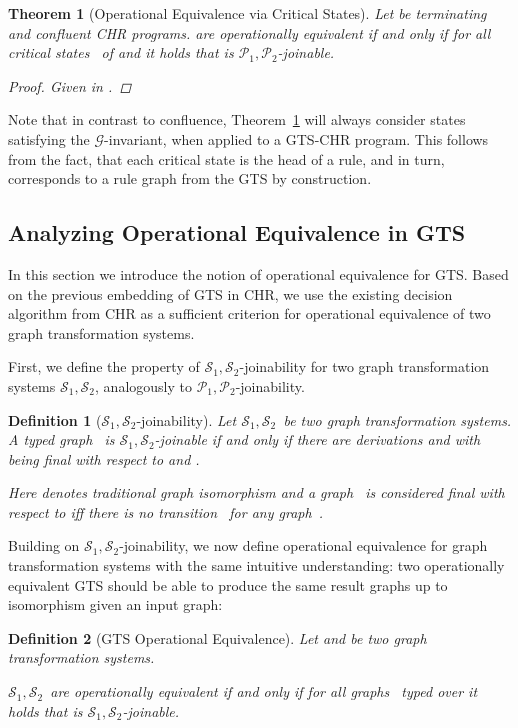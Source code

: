 \documentclass{tlp}
\newtheorem{theorem}{Theorem}\newtheorem{corollary}[theorem]{Corollary}
\newtheorem{definition}{Definition}[section]
\newcommand{\mcG}{\ensuremath{\mathcal{G}}}
\newcommand{\mcP}{\ensuremath{\mathcal{P}}}
\newcommand{\mcS}{\ensuremath{\mathcal{S}}}
\newcommand{\Ps}{\ensuremath{\mcP_1,\mcP_2}}
\newcommand{\Ss}{\ensuremath{\mcS_1,\mcS_2}}
\begin{document}
\begin{theorem}[Operational Equivalence via Critical States]\label{thm:opeq} Let
 be terminating and confluent CHR programs.  are operationally
equivalent if and only if for all critical states~ of  and
 it holds that  is \Ps-joinable.
\begin{proof}
Given in \cite{abdennadherfruehwirth99}.
\end{proof}
\end{theorem}

Note that in contrast to confluence, Theorem~\ref{thm:opeq} will always consider
states satisfying the \mcG-invariant, when applied to a GTS-CHR program. This
follows from the fact, that each critical state is the head of a rule, and in
turn, corresponds to a rule graph from the GTS by construction.

\subsection{Analyzing Operational Equivalence in GTS}
\label{sec:opeq_gts}

In this section we introduce the notion of operational equivalence for GTS. Based
on the previous embedding of GTS in CHR, we use the existing decision algorithm
from CHR as a sufficient criterion for operational equivalence of two graph
transformation systems.

First, we define the property of \Ss-joinability for two graph transformation
systems \Ss, analogously to \Ps-joinability.

\begin{definition}[\Ss-joinability]

Let \Ss\ be two graph transformation systems. A typed graph~ is
\emph{\Ss-joinable} if and only if there are derivations  and  with  being final with respect
to  and . 

Here  denotes traditional graph isomorphism and a graph~ is considered
\emph{final} with respect to  iff there is no transition~ for any graph~.
\end{definition}

Building on \Ss-joinability, we now define operational equivalence for graph
transformation systems with the same intuitive understanding: two operationally
equivalent GTS should be able to produce the same result graphs up to isomorphism
given an input graph:

\begin{definition}[GTS Operational Equivalence]\label{def:gts_oe}
Let  and  be two graph
transformation systems.

\Ss\ are \emph{operationally equivalent} if and only if for all graphs~ typed
over  it holds that  is \Ss-joinable.
\end{definition}
\end{document}
